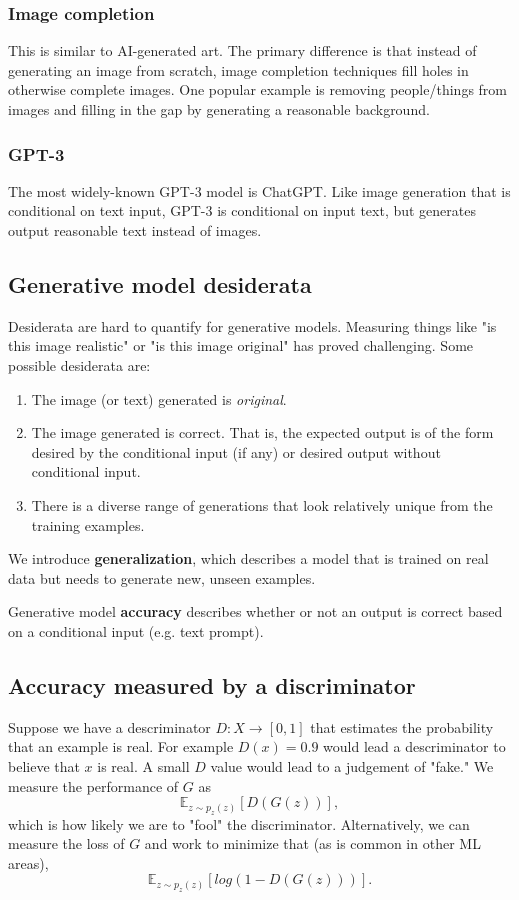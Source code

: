 \documentclass[titlepage, 12pt, leqno]{article}
\begin{document}
\subsubsection{Image completion}
This is similar to AI-generated art. The primary difference is that instead of
generating an image from scratch, image completion techniques fill holes in
otherwise complete images. One popular example is removing people/things from
images and filling in the gap by generating a reasonable background.

\subsubsection{GPT-3}
The most widely-known GPT-3 model is ChatGPT. Like image generation that is
conditional on text input, GPT-3 is conditional on input text, but generates
output reasonable text instead of images.

\subsection{Generative model desiderata}
Desiderata are hard to quantify for generative models. Measuring things like 
"is this image realistic" or "is this image original" has proved challenging.
Some possible desiderata are:
\begin{enumerate}
    \item The image (or text) generated is \textit{original}.
    \item The image generated is correct. That is, the expected output is of the
        form desired by the conditional input (if any) or desired output without
        conditional input.
    \item There is a diverse range of generations that look relatively unique
        from the training examples.
\end{enumerate}

\begin{definition}
    We introduce \textbf{generalization}, which describes a model that is
    trained on real data but needs to generate new, unseen examples.
\end{definition}

\begin{definition}
    Generative model \textbf{accuracy} describes whether or not an output is
    correct based on a conditional input (e.g. text prompt).
\end{definition}

\subsection{Accuracy measured by a discriminator}
Suppose we have a descriminator $D:X \rightarrow [0,1]$ that estimates the
probability that an example is real. For example $D(x)=0.9$ would lead a
descriminator to believe that $x$ is real. A small $D$ value would lead to a
judgement of "fake." We measure the performance of $G$ as
\[
    \mathbb{E}_{z \sim p_{z}(z)} [D(G(z))],
\]
which is how likely we are to "fool" the discriminator. Alternatively, we can 
measure the loss of $G$ and work to minimize that (as is common in other ML
areas),
\[
    \mathbb{E}_{z \sim p_{z}(z)} [log(1 - D(G(z)))].
\]
\end{document}
